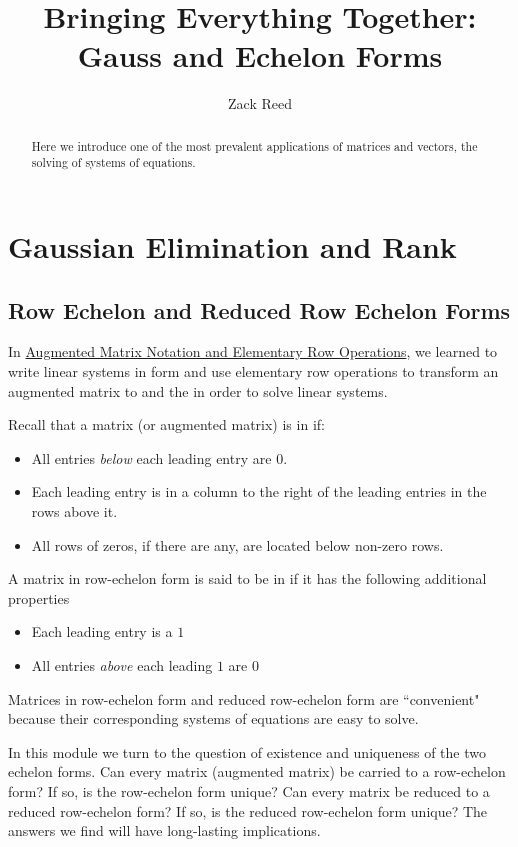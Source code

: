 \documentclass{ximera}
\author{Zack Reed} %
\title{Bringing Everything Together: Gauss and Echelon Forms}
\begin{document}
\begin{abstract}
Here we introduce one of the most prevalent applications of matrices and vectors, the solving of systems of equations.
\end{abstract}
\maketitle

\section*{Gaussian Elimination and Rank}
\subsection*{Row Echelon and Reduced Row Echelon Forms}
 
In \href{https://ximera.osu.edu/oerlinalg/LinearAlgebra/SYS-0020/main}{Augmented Matrix Notation and Elementary Row Operations}, we learned to write linear systems in  form and use elementary row operations to transform an augmented matrix to  and the  in order to solve linear systems. 
 
Recall that a matrix (or augmented matrix) is in  if:
\begin{itemize}
\item All entries {\it below} each leading entry are $0$.
\item Each leading entry is in a column to the right of the leading entries in the rows above it.
\item All rows of zeros, if there are any, are located below non-zero rows.
\end{itemize}
 
A matrix in row-echelon form is said to be in  if it has the following additional properties
\begin{itemize}
\item Each leading entry is a $1$
\item All entries {\it above} each leading $1$ are $0$
\end{itemize}
 
 
Matrices in row-echelon form and reduced row-echelon form are ``convenient" because their corresponding systems of equations are easy to solve. 
 
In this module we turn to the question of existence and uniqueness of the two echelon forms.  Can every matrix (augmented matrix) be carried to a row-echelon form?  If so, is the row-echelon form unique?  Can every matrix be reduced to a reduced row-echelon form?  If so, is the reduced row-echelon form unique?  The answers we find will have long-lasting implications.
 
\end{document}
